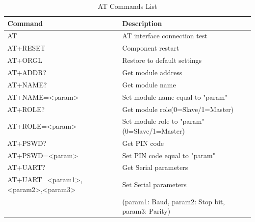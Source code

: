 \begin{table}[]
	\centering
	\begin{tabular}{|l|l|}
		\hline
		\textbf{Command} & \textbf{Description} \\
		\hline
		\hline
		AT & AT interface connection test \\
		\hline
		AT+RESET & Component restart \\
		\hline
		AT+ORGL & Restore to default settings \\
		\hline
		AT+ADDR? & Get module address \\
		\hline
		AT+NAME? & Get module name \\
		AT+NAME=<param> & Set module name equal to "param" \\
		\hline
		AT+ROLE? & Get module role(0=Slave/1=Master) \\
		AT+ROLE=<param> & Set module role to "param"(0=Slave/1=Master) \\
		\hline
		AT+PSWD? & Get PIN code \\
		AT+PSWD=<param> & Set PIN code equal to "param" \\
		\hline
		AT+UART? & Get Serial parameters \\
		AT+UART=<param1>,<param2>,<param3> & Set Serial parameters \\
		& (param1: Baud, param2: Stop bit, param3: Parity)\\
		\hline
	\end{tabular}
	\caption{AT Commands List}
	\label{ATCommands}
\end{table}
